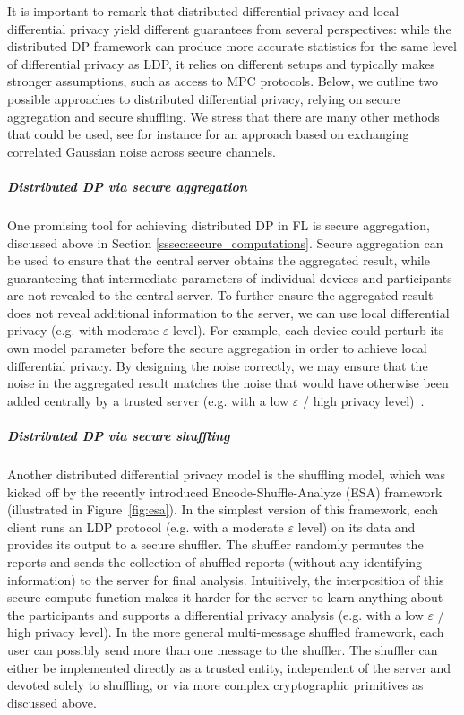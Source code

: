 \documentclass[11pt]{article}
\begin{document}
It is important to remark that distributed differential privacy and local differential privacy yield different guarantees from several perspectives: while the distributed DP framework can produce more accurate statistics for the same level of differential privacy as LDP, it relies on different setups and typically makes stronger assumptions, such as access to MPC protocols. Below, we outline two possible approaches to distributed differential privacy, relying on secure aggregation and secure shuffling. We stress that there are many other methods that could be used, see for instance \cite{sabater2020} for an approach based on exchanging correlated Gaussian noise across secure channels.

\subparagraph{Distributed DP via secure aggregation} One promising tool for achieving distributed DP in FL is secure aggregation, discussed above in Section \ref{sssec:secure_computations}. Secure aggregation can be used to ensure that the central server obtains the aggregated result, while guaranteeing that intermediate parameters of individual devices and participants are not revealed to the central server. To further ensure the aggregated result does not reveal additional information to the server, we can use local differential privacy (e.g. with moderate $\varepsilon$ level). For example, each device could perturb its own model parameter before the secure aggregation in order to achieve local differential privacy. By designing the noise correctly, we may ensure that the noise in the aggregated result matches the noise that would have otherwise been added centrally by a trusted server (e.g. with a low $\varepsilon$ / high privacy level)~\cite{Acs:2011:IDD:2042445.2042457, Rastogi:2010:DPA:1807167.1807247, Ghosh:2009:UUP:1536414.1536464, shi2011privacy, DBLP:journals/tdsc/GoryczkaX17}. 

\subparagraph{Distributed DP via secure shuffling} Another distributed differential privacy model is the shuffling model, which was kicked off by the recently introduced Encode-Shuffle-Analyze (ESA) framework~\cite{prochlo} (illustrated in Figure~\ref{fig:esa}). In the simplest version of this framework, each client runs an LDP protocol (e.g. with a moderate $\varepsilon$ level) on its data and provides its output to a secure shuffler. The shuffler randomly permutes the reports and sends the collection of shuffled reports (without any identifying information) to the server for final analysis. Intuitively, the interposition of this secure compute function makes it harder for the server to learn anything about the participants and supports a differential privacy analysis (e.g. with a low $\varepsilon$ / high privacy level). In the more general multi-message shuffled framework, each user can possibly send more than one message to the shuffler. The shuffler can either be implemented directly as a trusted entity, independent of the server and devoted solely to shuffling, or via more complex cryptographic primitives as discussed above.
\end{document}
